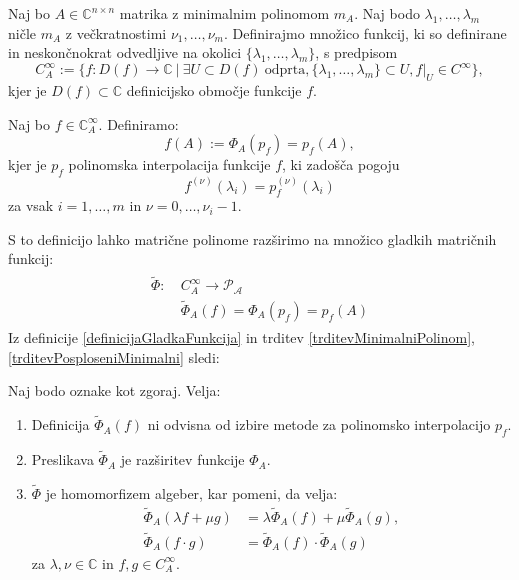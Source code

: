 \documentclass[mat1]{fmfdelo}
\newcommand{\C}{\mathbb C}
\begin{document}
Naj bo $A \in \C^{n \times n}$ matrika z minimalnim polinomom $m_A$. Naj bodo $\lambda_1, \ldots, \lambda_m$ ničle $m_A$ z večkratnostimi $\nu_1, \ldots, \nu_m$. Definirajmo množico funkcij, ki so definirane in neskončnokrat odvedljive na okolici $\{\lambda_1, \ldots, \lambda_m\}$, s predpisom
\begin{equation}
    C_A^\infty := \{ f: D(f) \rightarrow \C\ |\ \exists U \subset D(f)\ \text{odprta}, \{\lambda_1, \ldots, \lambda_m\} \subset U, f|_U \in C^\infty \},
\end{equation}
kjer je $D(f) \subset \C$ definicijsko območje funkcije $f$.
\begin{definicija} \label{definicijaGladkaFunkcija}
    Naj bo $f \in \C_A^\infty$. Definiramo:
    \begin{equation}
        f(A) := \Phi_A(p_f) = p_f(A),
    \end{equation}
    kjer je $p_f$ polinomska interpolacija funkcije $f$, ki zadošča pogoju
    \begin{equation}
        f^{(\nu)}(\lambda_i) = p_f^{(\nu)}(\lambda_i)
    \end{equation}
    za vsak $i = 1, \ldots, m$ in $\nu = 0, \ldots, \nu_i-1$.
\end{definicija}
S to definicijo lahko matrične polinome razširimo na množico gladkih matričnih funkcij:
\begin{align}
    \begin{split}
        \widetilde{\Phi} :\ &C_A^\infty \longrightarrow \mathcal{P_A} \\
        &\widetilde{\Phi}_A(f) = \Phi_A(p_f) = p_f(A)
    \end{split}
\end{align}
Iz definicije \ref{definicijaGladkaFunkcija} in trditev \ref{trditevMinimalniPolinom}, \ref{trditevPosploseniMinimalni} sledi:
\begin{trditev} \label{trditevPhiAlgebra}
    Naj bodo oznake kot zgoraj. Velja:
    \begin{enumerate}
        \item Definicija $\widetilde{\Phi}_A(f)$ ni odvisna od izbire metode za polinomsko interpolacijo $p_f$.
        \item Preslikava $\widetilde{\Phi}_A$ je razširitev funkcije $\Phi_A$.
        \item $\widetilde{\Phi}$ je homomorfizem algeber, kar pomeni, da velja:
        \begin{align*}
            \widetilde{\Phi}_A(\lambda f + \mu g) &= \lambda \widetilde{\Phi}_A(f) + \mu \widetilde{\Phi}_A(g), \\
            \widetilde{\Phi}_A(f \cdot g) &= \widetilde{\Phi}_A(f) \cdot \widetilde{\Phi}_A(g)
        \end{align*}
        za $\lambda, \nu \in \C$ in $f, g \in C_A^\infty$.
    \end{enumerate}
\end{trditev}
\end{document}
